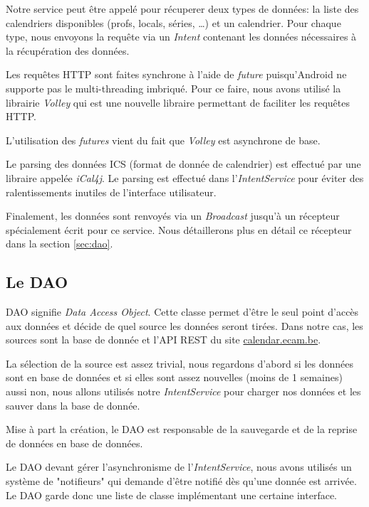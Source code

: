 \documentclass{article}
\begin{document}
            Notre service peut être appelé pour récuperer deux types de données: la liste des
            calendriers disponibles (profs, locals, séries, \ldots) et un calendrier. Pour chaque
            type, nous envoyons la requête via un \textit{Intent} contenant les données nécessaires
            à la récupération des données.

            Les requêtes HTTP sont faites synchrone à l'aide de \textit{future} puisqu'Android ne
            supporte pas le multi-threading imbriqué. Pour ce faire, nous avons utilisé la librairie
            \textit{Volley} qui est une nouvelle libraire permettant de faciliter les requêtes HTTP.

            L'utilisation des \textit{futures} vient du fait que \textit{Volley} est asynchrone de
            base.

            Le parsing des données ICS (format de donnée de calendrier) est effectué par une
            libraire appelée \textit{iCal4j}. Le parsing est effectué dans l'\textit{IntentService}
            pour éviter des ralentissements inutiles de l'interface utilisateur.

            Finalement, les données sont renvoyés via un \textit{Broadcast} jusqu'à un récepteur
            spécialement écrit pour ce service. Nous détaillerons plus en détail ce récepteur dans
            la section \ref{sec:dao}.

        \label{sec:dao}
        \subsection{Le DAO}
            DAO signifie \textit{Data Access Object}. Cette classe permet d'être le seul point
            d'accès aux données et décide de quel source les données seront tirées. Dans notre cas,
            les sources sont la base de donnée et l'API REST du site \url{calendar.ecam.be}.

            La sélection de la source est assez trivial, nous regardons d'abord si les données sont
            en base de données et si elles sont assez nouvelles (moins de 1 semaines) aussi non,
            nous allons utilisés notre \textit{IntentService} pour charger nos données et les sauver
            dans la base de donnée.

            Mise à part la création, le DAO est responsable de la sauvegarde et de la reprise de
            données en base de données.

            Le DAO devant gérer l'asynchronisme de l'\textit{IntentService}, nous avons utilisés un
            système de "notifieurs" qui demande d'être notifié dès qu'une donnée est arrivée. Le DAO
            garde donc une liste de classe implémentant une certaine interface.
\end{document}
